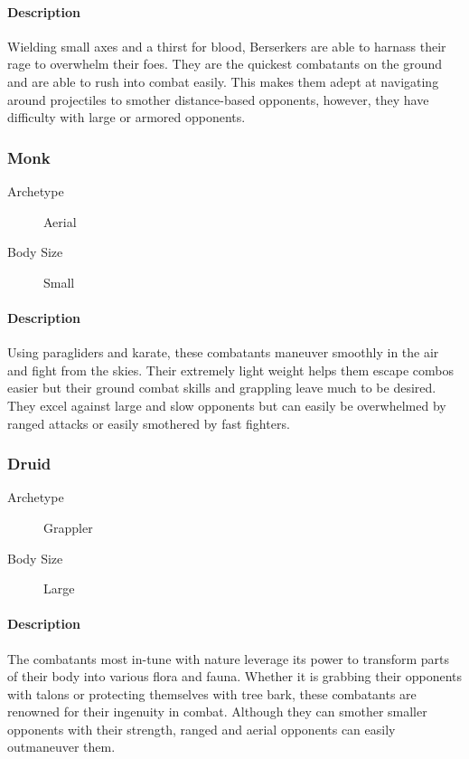 \paragraph{Description} Wielding small axes and a thirst for blood, Berserkers are able to harnass their rage to overwhelm their foes. They are the quickest combatants on the ground and are able to rush into combat easily. This makes them adept at navigating around projectiles to smother distance-based opponents, however, they have difficulty with large or armored opponents.

\subsubsection{Monk}

\begin{description}
    \item[Archetype] Aerial
    \item[Body Size] Small
\end{description}

\paragraph{Description} Using paragliders and karate, these combatants maneuver smoothly in the air and fight from the skies. Their extremely light weight helps them escape combos easier but their ground combat skills and grappling leave much to be desired. They excel against large and slow opponents but can easily be overwhelmed by ranged attacks or easily smothered by fast fighters.

\subsubsection{Druid}

\begin{description}
    \item[Archetype] Grappler
    \item[Body Size] Large
\end{description}

\paragraph{Description} The combatants most in-tune with nature leverage its power to transform parts of their body into various flora and fauna. Whether it is grabbing their opponents with talons or protecting themselves with tree bark, these combatants are renowned for their ingenuity in combat. Although they can smother smaller opponents with their strength, ranged and aerial opponents can easily outmaneuver them.

